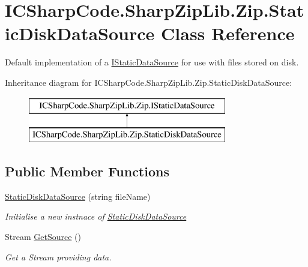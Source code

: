 \hypertarget{class_i_c_sharp_code_1_1_sharp_zip_lib_1_1_zip_1_1_static_disk_data_source}{}\section{I\+C\+Sharp\+Code.\+Sharp\+Zip\+Lib.\+Zip.\+Static\+Disk\+Data\+Source Class Reference}
\label{class_i_c_sharp_code_1_1_sharp_zip_lib_1_1_zip_1_1_static_disk_data_source}


Default implementation of a \hyperlink{interface_i_c_sharp_code_1_1_sharp_zip_lib_1_1_zip_1_1_i_static_data_source}{I\+Static\+Data\+Source} for use with files stored on disk.  


Inheritance diagram for I\+C\+Sharp\+Code.\+Sharp\+Zip\+Lib.\+Zip.\+Static\+Disk\+Data\+Source\+:\begin{figure}[H]
\begin{center}
\leavevmode
\includegraphics[height=2.000000cm]{class_i_c_sharp_code_1_1_sharp_zip_lib_1_1_zip_1_1_static_disk_data_source}
\end{center}
\end{figure}
\subsection*{Public Member Functions}
\begin{DoxyCompactItemize}
\item 
\hyperlink{class_i_c_sharp_code_1_1_sharp_zip_lib_1_1_zip_1_1_static_disk_data_source_a02adf36746a26984c2dc62df359b1a81}{Static\+Disk\+Data\+Source} (string file\+Name)
\begin{DoxyCompactList}\small\item\em Initialise a new instnace of \hyperlink{class_i_c_sharp_code_1_1_sharp_zip_lib_1_1_zip_1_1_static_disk_data_source}{Static\+Disk\+Data\+Source} \end{DoxyCompactList}\item 
Stream \hyperlink{class_i_c_sharp_code_1_1_sharp_zip_lib_1_1_zip_1_1_static_disk_data_source_a7de7990a0523c247bab40aa1ef0a3474}{Get\+Source} ()
\begin{DoxyCompactList}\small\item\em Get a Stream providing data. \end{DoxyCompactList}\end{DoxyCompactItemize}


